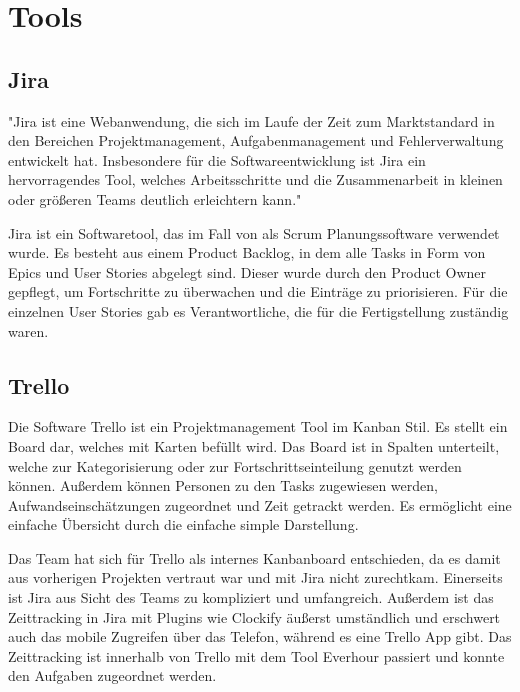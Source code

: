 
%


\section{Tools}\label{sec:tools}

\renewcommand{\kapitelautor}{Autor: Nils Hubmann}

\subsection{Jira}\label{subsec:jira}
%
"Jira ist eine Webanwendung, die sich im Laufe der Zeit zum Marktstandard in den Bereichen Projektmanagement, Aufgabenmanagement und Fehlerverwaltung entwickelt hat.
Insbesondere für die Softwareentwicklung ist Jira ein hervorragendes Tool, welches Arbeitsschritte und die Zusammenarbeit in kleinen oder größeren Teams deutlich erleichtern kann."

Jira ist ein Softwaretool, das im Fall von \ff als Scrum Planungssoftware verwendet wurde.
Es besteht aus einem Product Backlog, in dem alle Tasks in Form von Epics und User Stories abgelegt sind.
Dieser wurde durch den Product Owner gepflegt, um Fortschritte zu überwachen und die Einträge zu priorisieren.
Für die einzelnen User Stories gab es Verantwortliche, die für die Fertigstellung zuständig waren.


\subsection{Trello}\label{subsec:Trello}
%
Die Software Trello ist ein Projektmanagement Tool im Kanban Stil.
Es stellt ein Board dar, welches mit Karten befüllt wird.
Das Board ist in Spalten unterteilt, welche zur Kategorisierung oder zur Fortschrittseinteilung genutzt werden können.
Außerdem können Personen zu den Tasks zugewiesen werden, Aufwandseinschätzungen zugeordnet und Zeit getrackt werden.
Es ermöglicht eine einfache Übersicht durch die einfache simple Darstellung.

Das Team hat sich für Trello als internes Kanbanboard entschieden, da es damit aus vorherigen Projekten vertraut war und mit Jira nicht zurechtkam.
Einerseits ist Jira aus Sicht des Teams zu kompliziert und umfangreich.
Außerdem ist das Zeittracking in Jira mit Plugins wie Clockify äußerst umständlich und erschwert auch das mobile Zugreifen über das Telefon, während es eine Trello App gibt.
Das Zeittracking ist innerhalb von Trello mit dem Tool Everhour passiert und konnte den Aufgaben zugeordnet werden.
%
